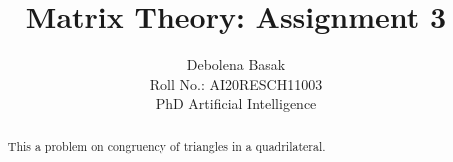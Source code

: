 \documentclass[journal,12pt,twocolumn]{IEEEtran}
\begin{document}
\makeatletter
{}
\makeatother
\let\StandardTheFigure\thefigure
\let\vec\mathbf
\renewcommand{\thefigure}{\theproblem}
\def\putbox#1#2#3{\makebox[0in][l]{\makebox[#1][l]{}\raisebox{\baselineskip}[0in][0in]{\raisebox{#2}[0in][0in]{#3}}}}
     \def\rightbox#1{\makebox[0in][r]{#1}}
     \def\centbox#1{\makebox[0in]{#1}}
     \def\topbox#1{\raisebox{-\baselineskip}[0in][0in]{#1}}
     \def\midbox#1{\raisebox{-0.5\baselineskip}[0in][0in]{#1}}
\vspace{3cm}
\title{Matrix Theory: Assignment 3}
\author{Debolena Basak\\ Roll No.: AI20RESCH11003\\ PhD Artificial Intelligence}

\maketitle
\newpage
\bigskip
\renewcommand{\thefigure}{\theenumi}
\renewcommand{\thetable}{\theenumi}
%
%
\begin{abstract}
This a problem on congruency of triangles in a quadrilateral.
\end{abstract}
\end{document}
